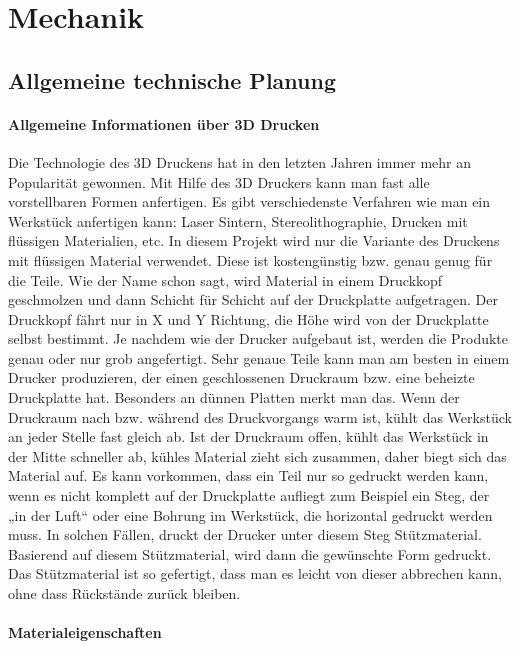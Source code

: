 \chapter{Mechanik}

\renewcommand{\kapitelautor}{Autor: Alexander Punz}

\section{Allgemeine technische Planung}
	
		\subsubsection{Allgemeine Informationen über 3D Drucken}

Die Technologie des 3D Druckens hat in den letzten Jahren immer mehr an Popularität gewonnen. Mit Hilfe des 3D Druckers kann man fast alle vorstellbaren Formen anfertigen. Es gibt verschiedenste Verfahren wie man ein Werkstück anfertigen kann: Laser Sintern, Stereolithographie, Drucken mit flüssigen Materialien, etc. In diesem Projekt wird nur die Variante des Druckens mit flüssigen Material verwendet. Diese ist kostengünstig bzw. genau genug für die Teile. Wie der Name schon sagt, wird Material in einem Druckkopf geschmolzen und dann Schicht für Schicht auf der Druckplatte aufgetragen. Der Druckkopf fährt nur in X und Y Richtung, die Höhe wird von der Druckplatte selbst bestimmt.
Je nachdem wie der Drucker aufgebaut ist, werden die Produkte genau oder nur grob angefertigt. Sehr genaue Teile kann man am besten in einem Drucker produzieren, der einen geschlossenen Druckraum bzw. eine beheizte Druckplatte hat. Besonders an dünnen Platten merkt man das. Wenn der Druckraum nach bzw. während des Druckvorgangs warm ist, kühlt das Werkstück an jeder Stelle fast gleich ab. Ist der Druckraum offen, kühlt das Werkstück in der Mitte schneller ab, kühles Material zieht sich zusammen, daher biegt sich das Material auf.
Es kann vorkommen, dass ein Teil nur so gedruckt werden kann, wenn es nicht komplett auf der Druckplatte aufliegt zum Beispiel ein Steg, der „in der Luft“ oder eine Bohrung im Werkstück, die horizontal gedruckt werden muss. In solchen Fällen, druckt der Drucker unter diesem Steg Stützmaterial. Basierend auf diesem Stützmaterial, wird dann die gewünschte Form gedruckt. Das Stützmaterial ist so gefertigt, dass man es leicht von dieser abbrechen kann, ohne dass Rückstände zurück bleiben.

		\subsubsection{Materialeigenschaften}

